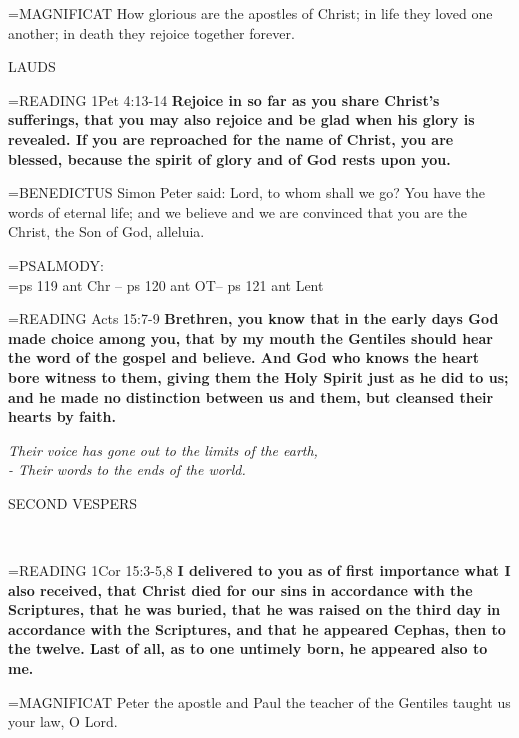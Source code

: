 \hangindent=\parindent \small{MAGNIFICAT  How glorious are the apostles of Christ; in life they loved
one another; in death they rejoice together forever.\\}
 
\begin{flushleft}\normalsize LAUDS\\\end{flushleft}

\hangindent=\parindent \small{READING} 1Pet 4:13-14 \textbf{Rejoice in so far as you share Christ’s sufferings,
that you may also rejoice and be glad when his glory is revealed. If
you are reproached for the name of Christ, you are blessed, because
the spirit of glory and of God rests upon you.\\}
 
\hangindent=\parindent \small{BENEDICTUS  Simon Peter said: Lord, to whom shall we go? You have
the words of eternal life; and we believe and we are convinced that
you are the Christ, the Son of God, alleluia.\\}
 
\hangindent=\parindent \small{PSALMODY:}\\
\hangindent=\parindent  ps 119 ant Chr -- ps 120 ant OT-- ps 121 ant Lent\vspace{0.5em}

\hangindent=\parindent \small{READING} Acts 15:7-9 \textbf{Brethren, you know that in the early days God
made choice among you, that by my mouth the Gentiles should
hear the word of the gospel and believe. And God who knows the
heart bore witness to them, giving them the Holy Spirit just as he
did to us; and he made no distinction between us and them, but
cleansed their hearts by faith.\\}
 
\begin{center}
\textit{Their voice has gone out to the limits of the earth,\\
- Their words to the ends of the world.}
\end{center}

\begin{flushleft}\normalsize \begin{flushleft}\normalsize SECOND VESPERS\\\end{flushleft}\\\end{flushleft}

\hangindent=\parindent \small{READING} 1Cor 15:3-5,8 \textbf{I delivered to you as of first importance what I
also received, that Christ died for our sins in accordance with the
Scriptures, that he was buried, that he was raised on the third day
in accordance with the Scriptures, and that he appeared Cephas,
then to the twelve. Last of all, as to one untimely born, he appeared
also to me.\\}
 
\hangindent=\parindent \small{MAGNIFICAT  Peter the apostle and Paul the teacher of the Gentiles
taught us your law, O Lord.\\}
 
